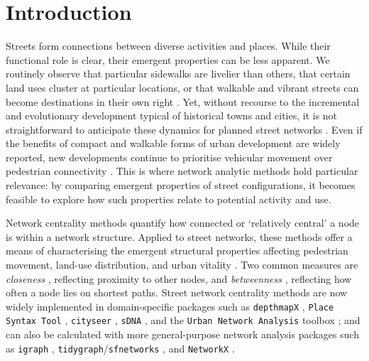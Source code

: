 \section{Introduction}

Streets form connections between diverse activities and places. While their functional role is clear, their emergent properties can be less apparent. We routinely observe that particular sidewalks are livelier than others, that certain land uses cluster at particular locations, or that walkable and vibrant streets can become destinations in their own right \cite{Jacobs1961}. Yet, without recourse to the incremental and evolutionary development typical of historical towns and cities, it is not straightforward to anticipate these dynamics for planned street networks \cite{Alexander1967}. Even if the benefits of compact and walkable forms of urban development are widely reported, new developments continue to prioritise vehicular movement over pedestrian connectivity \cite{transport_for_new_homes_what_2025}. This is where network analytic methods hold particular relevance: by comparing emergent properties of street configurations, it becomes feasible to explore how such properties relate to potential activity and use.

Network centrality methods quantify how connected or `relatively central' a node is within a network structure. Applied to street networks, these methods offer a means of characterising the emergent structural properties affecting pedestrian movement, land-use distribution, and urban vitality \cite{Hillier1984, Penn1998, Porta2009}. Two common measures are \emph{closeness} \cite{Sabidussi1966}, reflecting proximity to other nodes, and \emph{betweenness} \cite{Freeman1977}, reflecting how often a node lies on shortest paths. Street network centrality methods are now widely implemented in domain-specific packages such as \texttt{depthmapX} \cite{Hillier2012}, \texttt{Place Syntax Tool} \cite{stahle_place_2023}, \texttt{cityseer} \cite{simons_cityseer_2023}, \texttt{sDNA} \cite{cooper_sdna_2020}, and the \texttt{Urban Network Analysis} toolbox \cite{Sevtsuk2012}; and can also be calculated with more general-purpose network analysis packages such as \texttt{igraph} \cite{csardi_igraph_2006}, \texttt{tidygraph}/\texttt{sfnetworks} \cite{pedersen_tidygraph_2024, vanderbie_sfnetworks_2021}, and \texttt{NetworkX} \cite{hagberg_exploring_2008}.


